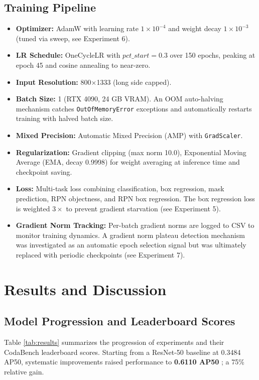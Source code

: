 \documentclass[12pt, a4paper]{article}
\begin{document}
\subsection{Training Pipeline}

\begin{itemize}
    \item \textbf{Optimizer:} AdamW \cite{loshchilov2017} with learning rate $1 \times 10^{-4}$ and weight decay $1 \times 10^{-3}$ (tuned via sweep, see Experiment 6).
    \item \textbf{LR Schedule:} OneCycleLR \cite{smith2019} with $pct\_start = 0.3$ over 150 epochs, peaking at epoch 45 and cosine annealing to near-zero.
    \item \textbf{Input Resolution:} 800$\times$1333 (long side capped).
    \item \textbf{Batch Size:} 1 (RTX 4090, 24 GB VRAM). An OOM auto-halving mechanism catches \texttt{OutOfMemoryError} exceptions and automatically restarts training with halved batch size.
    \item \textbf{Mixed Precision:} Automatic Mixed Precision (AMP) with \texttt{GradScaler}.
    \item \textbf{Regularization:} Gradient clipping (max norm 10.0), Exponential Moving Average (EMA, decay 0.9998) for weight averaging at inference time and checkpoint saving.
    \item \textbf{Loss:} Multi-task loss combining classification, box regression, mask prediction, RPN objectness, and RPN box regression. The box regression loss is weighted $3\times$ to prevent gradient starvation (see Experiment 5).
    \item \textbf{Gradient Norm Tracking:} Per-batch gradient norms are logged to CSV to monitor training dynamics. A gradient norm plateau detection mechanism was investigated as an automatic epoch selection signal but was ultimately replaced with periodic checkpoints (see Experiment 7).
\end{itemize}

\section{Results and Discussion}

\subsection{Model Progression and Leaderboard Scores}
Table \ref{tab:results} summarizes the progression of experiments and their CodaBench leaderboard scores. Starting from a ResNet-50 baseline at 0.3484 AP50, systematic improvements raised performance to \textbf{0.6110 AP50} ; a 75\% relative gain.
\end{document}

